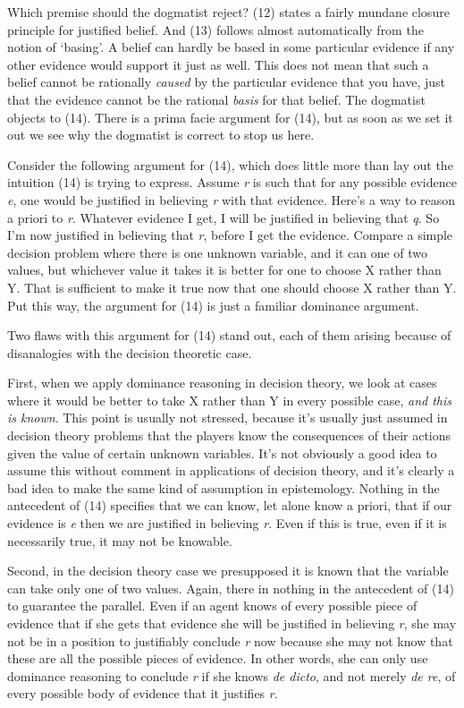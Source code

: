 \documentclass[
  11pt,
  letterpaper,
  DIV=11,
  numbers=noendperiod,
  twoside]{scrartcl}
\begin{document}
Which premise should the dogmatist reject? (12) states a fairly mundane
closure principle for justified belief. And (13) follows almost
automatically from the notion of `basing'. A belief can hardly be based
in some particular evidence if any other evidence would support it just
as well. This does not mean that such a belief cannot be rationally
\emph{caused} by the particular evidence that you have, just that the
evidence cannot be the rational \emph{basis} for that belief. The
dogmatist objects to (14). There is a prima facie argument for (14), but
as soon as we set it out we see why the dogmatist is correct to stop us
here.

Consider the following argument for (14), which does little more than
lay out the intuition (14) is trying to express. Assume \emph{r} is such
that for any possible evidence \emph{e}, one would be justified in
believing \emph{r} with that evidence. Here's a way to reason a priori
to \emph{r}. Whatever evidence I get, I will be justified in believing
that \emph{q}. So I'm now justified in believing that \emph{r}, before I
get the evidence. Compare a simple decision problem where there is one
unknown variable, and it can one of two values, but whichever value it
takes it is better for one to choose X rather than Y. That is sufficient
to make it true now that one should choose X rather than Y. Put this
way, the argument for (14) is just a familiar dominance argument.

Two flaws with this argument for (14) stand out, each of them arising
because of disanalogies with the decision theoretic case.

First, when we apply dominance reasoning in decision theory, we look at
cases where it would be better to take X rather than Y in every possible
case, \emph{and this is known}. This point is usually not stressed,
because it's usually just assumed in decision theory problems that the
players know the consequences of their actions given the value of
certain unknown variables. It's not obviously a good idea to assume this
without comment in applications of decision theory, and it's clearly a
bad idea to make the same kind of assumption in epistemology. Nothing in
the antecedent of (14) specifies that we can know, let alone know a
priori, that if our evidence is \emph{e} then we are justified in
believing \emph{r}. Even if this is true, even if it is necessarily
true, it may not be knowable.

Second, in the decision theory case we presupposed it is known that the
variable can take only one of two values. Again, there in nothing in the
antecedent of (14) to guarantee the parallel. Even if an agent knows of
every possible piece of evidence that if she gets that evidence she will
be justified in believing \emph{r}, she may not be in a position to
justifiably conclude \emph{r} now because she may not know that these
are all the possible pieces of evidence. In other words, she can only
use dominance reasoning to conclude \emph{r} if she knows \emph{de
dicto}, and not merely \emph{de re}, of every possible body of evidence
that it justifies \emph{r}.
\end{document}
